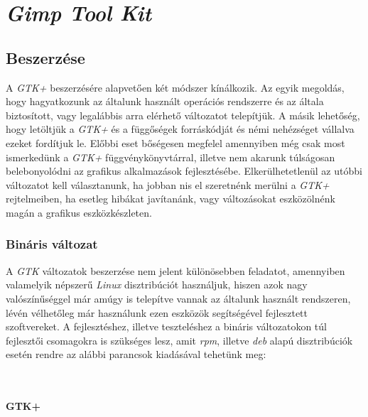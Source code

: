 \section{\textit{Gimp Tool Kit}}

\subsection{Beszerzése}

A \textit{GTK+} beszerzésére alapvetően két módszer kínálkozik. Az egyik megoldás, hogy hagyatkozunk az általunk használt operációs rendszerre és az általa biztosított, vagy legalábbis arra elérhető változatot telepítjük. A másik lehetőség, hogy letöltjük a \textit{GTK+} és a függőségek forráskódját és némi nehézséget vállalva ezeket fordítjuk le. Előbbi eset bőségesen megfelel amennyiben még csak most ismerkedünk a \textit{GTK+} függvénykönyvtárral, illetve nem akarunk túlságosan belebonyolódni az grafikus alkalmazások fejlesztésébe. Elkerülhetetlenül az utóbbi változatot kell választanunk, ha jobban nis el szeretnénk merülni a \textit{GTK+} rejtelmeiben, ha esetleg hibákat javítanánk, vagy változásokat eszközölnénk magán a grafikus eszközkészleten.

\subsubsection{Bináris változat}

A \textit{GTK} változatok beszerzése nem jelent különösebben feladatot, amennyiben valamelyik népszerű \textit{Linux} disztribúciót használjuk, hiszen azok nagy valószínűséggel már amúgy is telepítve vannak az általunk használt rendszeren, lévén vélhetőleg már használunk ezen eszközök segítségével fejlesztett szoftvereket. A fejlesztéshez, illetve teszteléshez a bináris változatokon túl fejlesztői csomagokra is szükséges lesz, amit \textit{rpm}, illetve \textit{deb} alapú disztribúciók esetén rendre az alábbi parancsok kiadásával tehetünk meg:

\\

\paragraph{GTK+}

